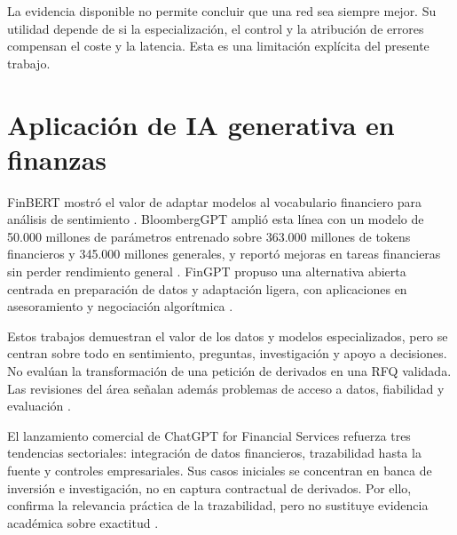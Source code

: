 La evidencia disponible no permite concluir que una red sea siempre mejor. Su utilidad depende de si la especialización, el control y la atribución de errores compensan el coste y la latencia. Esta es una limitación explícita del presente trabajo.

\section{Aplicación de IA generativa en finanzas}
\label{sec:ia_generativa_finanzas}

FinBERT mostró el valor de adaptar modelos al vocabulario financiero para análisis de sentimiento \citep{araci2019finbert}. BloombergGPT amplió esta línea con un modelo de 50.000 millones de parámetros entrenado sobre 363.000 millones de tokens financieros y 345.000 millones generales, y reportó mejoras en tareas financieras sin perder rendimiento general \citep[secs.~2--5]{wu2023bloomberggpt}. FinGPT propuso una alternativa abierta centrada en preparación de datos y adaptación ligera, con aplicaciones en asesoramiento y negociación algorítmica \citep{yang2023fingpt}.

Estos trabajos demuestran el valor de los datos y modelos especializados, pero se centran sobre todo en sentimiento, preguntas, investigación y apoyo a decisiones. No evalúan la transformación de una petición de derivados en una RFQ validada. Las revisiones del área señalan además problemas de acceso a datos, fiabilidad y evaluación \citep{shah2023finllms,yordanova2025financialagents}.

El lanzamiento comercial de ChatGPT for Financial Services refuerza tres tendencias sectoriales: integración de datos financieros, trazabilidad hasta la fuente y controles empresariales. Sus casos iniciales se concentran en banca de inversión e investigación, no en captura contractual de derivados. Por ello, confirma la relevancia práctica de la trazabilidad, pero no sustituye evidencia académica sobre exactitud \citep{openai2026financialservices}.

